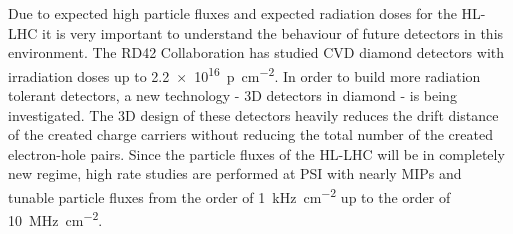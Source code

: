 Due to expected high particle fluxes and expected radiation doses for the \ac{HL-LHC} it is very important to understand the behaviour of future detectors in this environment. The RD42 Collaboration has studied \ac{CVD} diamond detectors with irradiation doses up to \SI{2.2e16}{p\per\centi\meter^2}. In order to build more radiation tolerant detectors, a new technology - 3D detectors in diamond \cite{3D} - is being investigated. The 3D design of these detectors heavily reduces the drift distance of the created charge carriers without reducing the total number of the created electron-hole pairs. Since the particle fluxes of the \ac{HL-LHC} will be in completely new regime, high rate studies are performed at \ac{PSI} with nearly \acp{MIP} and tunable particle fluxes from the order of \SI{1}{\kilo\hertz\per cm^2} up to the order of \SI{10}{\mega\hertz\per cm^2}.